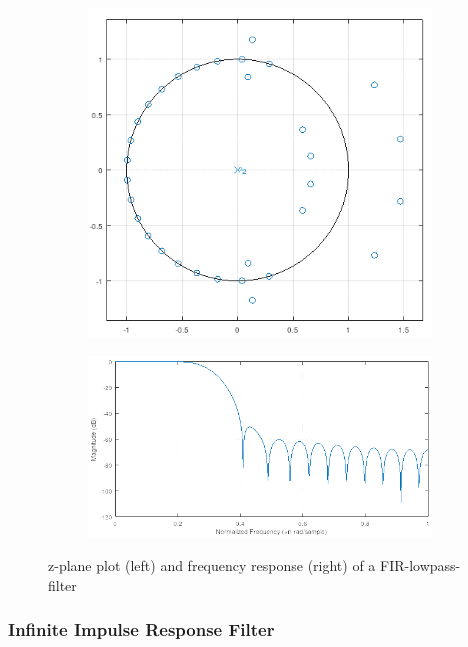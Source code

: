 \begin{figure}[!h]
    \begin{subfigure}[c]{0.35\textwidth}
        \centering
        \includegraphics[width=\textwidth]{img/fir-zplane.png}
    \end{subfigure}
    \begin{subfigure}[c]{0.65\textwidth}
        \centering
        \includegraphics[width=\textwidth]{img/fir-freq.png}
    \end{subfigure}
    \caption{z-plane plot (left) and frequency response (right) of a \ac{FIR}-lowpass-filter}
    \label{fig:FIR-z-plane-and-freq}
\end{figure}

\subsubsection{Infinite Impulse Response Filter}

